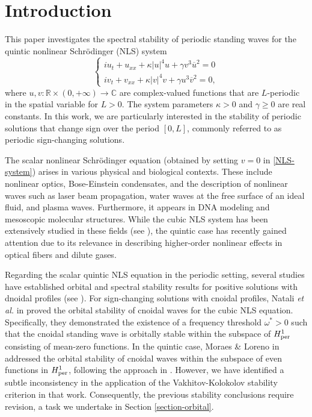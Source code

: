 \documentclass[10pt,reqno,a4paper]{amsart} %
\theoremstyle{definition} %
\numberwithin{equation}{section}
\numberwithin{figure}{section}
\begin{document}
\section{Introduction} 

This paper investigates the spectral stability of periodic standing waves for the quintic nonlinear Schrödinger (NLS) system
\begin{equation}\label{NLS-system}
	\left\{ \begin{array}{l}
		i u_t + u_{xx} + \kappa |u|^4 u + \gamma v^3 \overline{u}^2 = 0 \\
		i v_t + v_{xx} + \kappa |v|^4 v + \gamma u^3 \overline{v}^2 = 0,
	\end{array}
\right.
\end{equation}
where $u,v: \mathbb{R} \times (0,+\infty) \rightarrow \mathbb{C}$ are complex-valued functions that are $L$-periodic in the spatial variable for $L>0$. The system parameters $\kappa > 0$ and $\gamma \geq 0$ are real constants. In this work, we are particularly interested in the stability of periodic solutions that change sign over the period $[0, L]$, commonly referred to as periodic sign-changing solutions.

The scalar nonlinear Schrödinger equation (obtained by setting $v = 0$ in \eqref{NLS-system}) arises in various physical and biological contexts. These include nonlinear optics, Bose-Einstein condensates, and the description of nonlinear waves such as laser beam propagation, water waves at the free surface of an ideal fluid, and plasma waves. Furthermore, it appears in DNA modeling and mesoscopic molecular structures. While the cubic NLS system has been extensively studied in these fields (see \cite{Agrawal, IedaMiyakawaWadati, KannaSakkaravarthi, WangCui}), the quintic case has recently gained attention due to its relevance in describing higher-order nonlinear effects in optical fibers and dilute gases.

Regarding the scalar quintic NLS equation in the periodic setting, several studies have established orbital and spectral stability results for positive solutions with dnoidal profiles (see \cite{AnguloNatali2009, HakkaevStanislavovaStefanov}). For sign-changing solutions with cnoidal profiles, Natali \textit{et al.} in \cite{NataliMoraesLorenoPastor} proved the orbital stability of cnoidal waves for the cubic NLS equation. Specifically, they demonstrated the existence of a frequency threshold $\omega^*>0$ such that the cnoidal standing wave is orbitally stable within the subspace of $H^1_{\rm per}$ consisting of mean-zero functions. In the quintic case, Moraes \& Loreno in \cite{BittencourtLoreno2022} addressed the orbital stability of cnoidal waves within the subspace of even functions in $H^1_{\rm per}$, following the approach in \cite{grillakis2, ShatahStrauss}. However, we have identified a subtle inconsistency in the application of the Vakhitov-Kolokolov stability criterion in that work. Consequently, the previous stability conclusions require revision, a task we undertake in Section \ref{section-orbital}.
\end{document}
